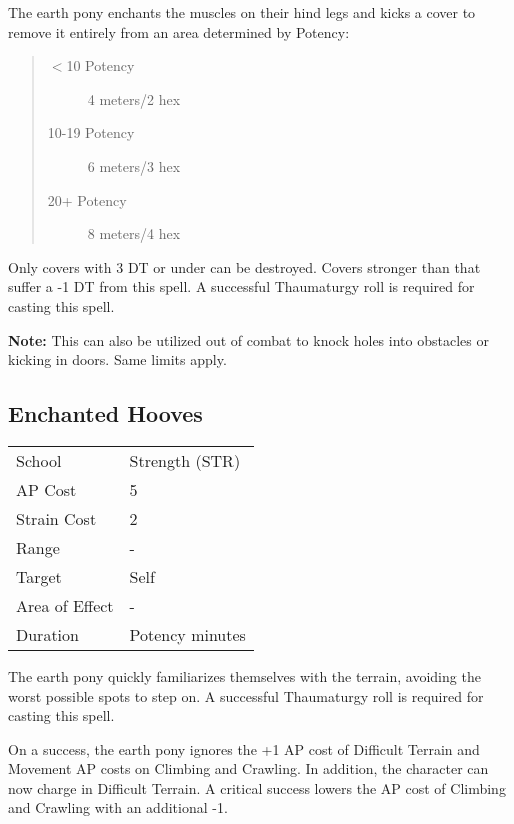 \documentclass[11pt,a4paper,twocolumn]{book}
\begin{document}
\medskip

The earth pony enchants the muscles on their hind legs and kicks a cover to remove it entirely from an area determined by Potency:

\begin{quote}
	\begin{description}
		\item[$<$10 Potency] 	4 meters/2 hex
		\item[10-19 Potency] 	6 meters/3 hex
		\item[20+ Potency] 	    8 meters/4 hex
	\end{description}
\end{quote}

Only covers with 3 DT or under can be destroyed. Covers stronger than that suffer a -1 DT from this spell. A successful Thaumaturgy roll is required for casting this spell.

\textbf{Note:} This can also be utilized out of combat to knock holes into obstacles or kicking in doors. Same limits apply.

\vfill

\subsection*{Enchanted Hooves}
{
	\begin{tabu} to 75mm{| X[l,4] | X[l,7] |}
		\hline
		School 			& Strength (STR) 	\\
		AP Cost	      	& 5 				\\
		Strain Cost     & 2 				\\
		Range     		& - 				\\
		Target      	& Self 				\\
		Area of Effect  & - 	 			\\
		Duration     	& Potency minutes 	\\ \hline
	\end{tabu}
	
}

\medskip

The earth pony quickly familiarizes themselves with the terrain, avoiding the worst possible spots to step on. A successful Thaumaturgy roll is required for casting this spell. 

On a success, the earth pony ignores the +1 AP cost of Difficult Terrain and Movement AP costs on Climbing and Crawling. In addition, the character can now charge in Difficult Terrain. A critical success lowers the AP cost of Climbing and Crawling with an additional -1.
\end{document}
